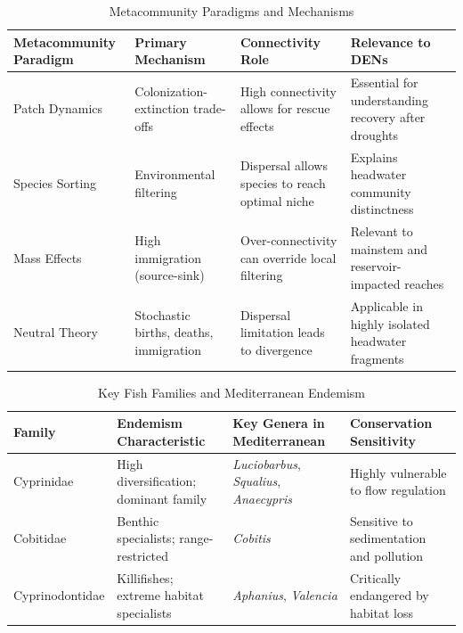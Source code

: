 \documentclass[11pt,a4paper]{article}
\begin{document}
{\begin{table}[h!]
\centering
\caption{Metacommunity Paradigms and Mechanisms}
\begin{tabular}{p{3.5cm} p{3.5cm} p{3.5cm} p{3.5cm}}
\toprule
\textbf{Metacommunity Paradigm} & \textbf{Primary Mechanism} & \textbf{Connectivity Role} & \textbf{Relevance to DENs} \\
\midrule
Patch Dynamics & Colonization-extinction trade-offs & High connectivity allows for rescue effects & Essential for understanding recovery after droughts \cite{leibold2004metacommunity} \\
\midrule
Species Sorting & Environmental filtering & Dispersal allows species to reach optimal niche & Explains headwater community distinctness \cite{leibold2004metacommunity} \\
\midrule
Mass Effects & High immigration (source-sink) & Over-connectivity can override local filtering & Relevant to mainstem and reservoir-impacted reaches \cite{brown2011metacommunity} \\
\midrule
Neutral Theory & Stochastic births, deaths, immigration & Dispersal limitation leads to divergence & Applicable in highly isolated headwater fragments \cite{brown2011metacommunity} \\
\bottomrule
\end{tabular}
\end{table}

\newpage

\begin{table}[h!]
\centering
\caption{Key Fish Families and Mediterranean Endemism}
\begin{tabular}{p{3cm} p{3.5cm} p{3.5cm} p{3.5cm}}
\toprule
\textbf{Family} & \textbf{Endemism Characteristic} & \textbf{Key Genera in Mediterranean} & \textbf{Conservation Sensitivity} \\
\midrule
Cyprinidae & High diversification; dominant family & \textit{Luciobarbus}, \textit{Squalius}, \textit{Anaecypris} & Highly vulnerable to flow regulation \cite{DeMiguel2014} \\
\midrule
Cobitidae & Benthic specialists; range-restricted & \textit{Cobitis} & Sensitive to sedimentation and pollution \cite{DeMiguel2014} \\
\midrule
Cyprinodontidae & Killifishes; extreme habitat specialists & \textit{Aphanius}, \textit{Valencia} & Critically endangered by habitat loss \cite{DeMiguel2014} \\
\bottomrule
\end{tabular}
\end{table}

}
\end{document}
